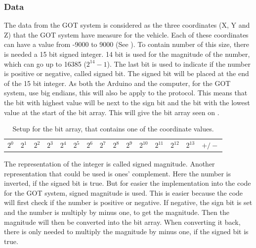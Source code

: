 \subsubsection{Data}
The data from the GOT system is considered as the three coordinates (X, Y and Z) that the GOT system have measure for the vehicle. Each of these coordinates can have a value from -9000 to 9000 (See ). To contain number of this size, there is needed a 15 bit signed integer. 14 bit is used for the magnitude of the number, which can go up to 16385 ($2^{14}-1$). The last bit is used to indicate if the number is positive or negative, called signed bit. The signed bit will be placed at the end of the 15 bit integer. As both the Arduino and the computer, for the GOT system, use big endians, this will also be apply to the protocol. This means that the bit with highest value will be next to the sign bit and the bit with the lowest value at the start of the bit array. This will give the bit array seen on .

\begin{table}[H]
\centering
\begin{tabular}{|>{\centering\arraybackslash}m{0.5cm}|>{\centering\arraybackslash}m{0.5cm}|>{\centering\arraybackslash}m{0.5cm}|>{\centering\arraybackslash}m{0.5cm}|>{\centering\arraybackslash}m{0.5cm}|>{\centering\arraybackslash}m{0.5cm}|>{\centering\arraybackslash}m{0.5cm}|>{\centering\arraybackslash}m{0.5cm}|>{\centering\arraybackslash}m{0.5cm}|>{\centering\arraybackslash}m{0.5cm}|>{\centering\arraybackslash}m{0.5cm}|>{\centering\arraybackslash}m{0.5cm}|>{\centering\arraybackslash}m{0.5cm}|>{\centering\arraybackslash}m{0.5cm}|>{\centering\arraybackslash}m{0.65cm}|}
\multicolumn{15}{c}{15 bits} \\
\hline
$2^0$ & $2^1$ & $2^2$ & $2^3$ & $2^4$ & $2^5$ & $2^6$ & $2^7$ & $2^8$ & $2^9$ & $2^{10}$ & $2^{11}$ & $2^{12}$ & $2^{13}$ & $+/-$ \\
\hline
\end{tabular}
\caption{Setup for the bit array, that contains one of the coordinate values.}
\label{CoorSetup}
\end{table}

The representation of the integer is called signed magnitude. Another representation that could be used is ones' complement. Here the number is inverted, if the signed bit is true. But for easier the implementation into the code for the GOT system, signed magnitude is used. This is easier because the code will first check if the number is positive or negative. If negative, the sign bit is set and the number is multiply by minus one, to get the magnitude. Then the magnitude will then be converted into the bit array. When converting it back, there is only needed to multiply the magnitude by minus one, if the signed bit is true.

